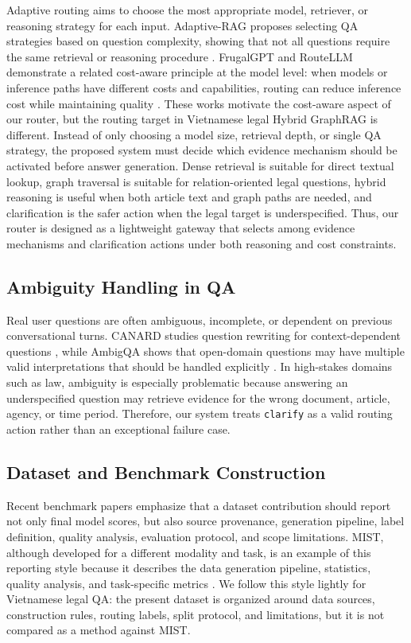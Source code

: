 \documentclass[11pt,twocolumn]{article}
\begin{document}
Adaptive routing aims to choose the most appropriate model,
retriever, or reasoning strategy for each input. Adaptive-RAG
proposes selecting QA strategies based on question
complexity, showing that not all questions require the same
retrieval or reasoning procedure \cite{jeong2024adaptive}.
FrugalGPT and RouteLLM demonstrate a related cost-aware
principle at the model level: when models or inference paths
have different costs and capabilities, routing can reduce
inference cost while maintaining quality
\cite{chen2023frugalgpt,ong2024routellm}. These works
motivate the cost-aware aspect of our router, but the routing
target in Vietnamese legal Hybrid GraphRAG is different.
Instead of only choosing a model size, retrieval depth, or
single QA strategy, the proposed system must decide which
evidence mechanism should be activated before answer
generation. Dense retrieval is suitable for direct textual
lookup, graph traversal is suitable for relation-oriented
legal questions, hybrid reasoning is useful when both article
text and graph paths are needed, and clarification is the
safer action when the legal target is underspecified. Thus,
our router is designed as a lightweight gateway that selects
among evidence mechanisms and clarification actions under
both reasoning and cost constraints.

\subsection{Ambiguity Handling in QA}

Real user questions are often ambiguous, incomplete, or
dependent on previous conversational turns. CANARD studies
question rewriting for context-dependent questions
\cite{elgohary2019canard}, while AmbigQA shows that
open-domain questions may have multiple valid
interpretations that should be handled explicitly
\cite{min2020ambigqa}. In high-stakes domains such as law,
ambiguity is especially problematic because answering an
underspecified question may retrieve evidence for the wrong
document, article, agency, or time period. Therefore, our
system treats \texttt{clarify} as a valid routing action
rather than an exceptional failure case.

\subsection{Dataset and Benchmark Construction}

Recent benchmark papers emphasize that a dataset contribution
should report not only final model scores, but also source
provenance, generation pipeline, label definition, quality
analysis, evaluation protocol, and scope limitations. MIST,
although developed for a different modality and task, is an
example of this reporting style because it describes the data
generation pipeline, statistics, quality analysis, and
task-specific metrics \cite{vu2026mist}. We follow this style
lightly for Vietnamese legal QA: the present dataset is
organized around data sources, construction rules, routing
labels, split protocol, and limitations, but it is not compared
as a method against MIST.
\end{document}
